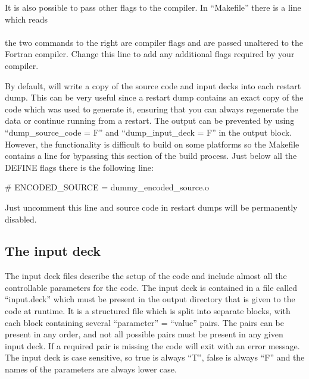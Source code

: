 It is also possible to pass other flags to the compiler. In ``Makefile'' there
is a line which reads\\
\indent{}\\
the two commands to the right are compiler flags and are passed unaltered to
the Fortran compiler. Change this line to add any additional flags required by
your compiler.

By default, {\EPOCH} will write a copy of the source code and input decks
into each restart dump. This can be very useful since a restart dump contains
an exact copy of the code which was used to generate it, ensuring that you
can always regenerate the data or continue running from a restart.
The output can be prevented by using ``dump\_source\_code = F'' and
``dump\_input\_deck = F'' in the output block.
However, the functionality is difficult to build on some platforms so
the Makefile contains a line for bypassing this section of the build
process. Just below all the DEFINE flags there is the following line:
\begin{boxverbatim}
# ENCODED_SOURCE = dummy_encoded_source.o
\end{boxverbatim}
Just uncomment this line and source code in restart dumps will be permanently
disabled.


\subsection{The {\EPOCH} input deck}
The input deck files describe the setup of the code and
include almost all the controllable parameters for the code. The input deck is
contained in a file called ``input.deck'' which must be present in the output
directory that is given to the code at runtime. It is a structured
file which is split into separate blocks, with each block containing several
``parameter'' = ``value'' pairs. The pairs can be present in any order, and not
all possible pairs must be present in any given input deck. If a required pair
is missing the code will exit with an error message. The input deck is case
sensitive, so true is always ``T'', false is always ``F'' and the names of
the parameters are always lower case.\\

